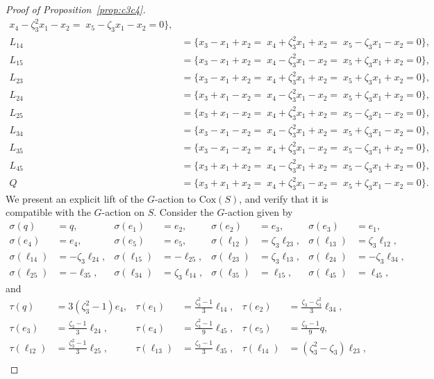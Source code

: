\documentclass[12pt, reqno]{amsart}
\theoremstyle{plain}
\theoremstyle{remark}
\theoremstyle{definition}
\numberwithin{equation}{section}
\def\Cox{\mathrm{Cox}}
\begin{document}
\begin{proof}[Proof of Proposition~\ref{prop:c3c4}]
{\begin{align*}
x_4-\zeta_3^2x_1-x_2=\;
x_5-\zeta_3 x_1-x_2
=0\},\\
L_{14}
&= \{
x_3-x_1+x_2=\;
x_4+\zeta_3^2x_1+x_2=\;
x_5-\zeta_3 x_1-x_2
=0\},\\
L_{15}
&= \{
x_3-x_1+x_2=\;
x_4-\zeta_3^2x_1-x_2=\;
x_5+\zeta_3 x_1+x_2
=0\},\\
L_{23}
&= \{
x_3-x_1+x_2=\;
x_4+\zeta_3^2x_1+x_2=\;
x_5+\zeta_3 x_1+x_2
=0\},\\
L_{24}
&= \{
x_3+x_1-x_2=\;
x_4-\zeta_3^2x_1-x_2=\;
x_5+\zeta_3 x_1+x_2
=0\},\\
L_{25}
&= \{
x_3+x_1-x_2=\;
x_4+\zeta_3^2x_1+x_2=\;
x_5-\zeta_3 x_1-x_2
=0\},\\
L_{34}
&= \{
x_3-x_1-x_2=\;
x_4-\zeta_3^2x_1+x_2=\;
x_5+\zeta_3 x_1-x_2
=0\},\\
L_{35}
&= \{
x_3-x_1-x_2=\;
x_4+\zeta_3^2x_1-x_2=\;
x_5-\zeta_3 x_1+x_2
=0\},\\
L_{45}
&= \{
x_3+x_1+x_2=\;
x_4-\zeta_3^2x_1+x_2=\;
x_5-\zeta_3 x_1+x_2
=0\},\\
Q
&= \{
x_3+x_1+x_2=\;
x_4+\zeta_3^2x_1-x_2=\;
x_5+\zeta_3 x_1-x_2=0
\}.
\end{align*}}
 We present an explicit lift of the $G$-action to $\Cox(S)$, and verify that it is compatible with the $G$-action on $S$. Consider the $G$-action given by
\begin{align*}
\sigma(q)&=q,&
\sigma(e_1)&=e_2,&
\sigma(e_2)&=e_3,&
\sigma(e_3)&=e_1,\\
\sigma(e_4)&=e_4,&
\sigma(e_5)&=e_5,&
\sigma(\ell_{12})&=\zeta_3\ell_{23},&
\sigma(\ell_{13})&=\zeta_3\ell_{12},\\
\sigma(\ell_{14})&=-\zeta_3\ell_{24},&
\sigma(\ell_{15})&=-\ell_{25},&
\sigma(\ell_{23})&=\zeta_3\ell_{13},&
\sigma(\ell_{24})&=-\zeta_3\ell_{34},\\
\sigma(\ell_{25})&=-\ell_{35},&
\sigma(\ell_{34})&=\zeta_3\ell_{14},&
\sigma(\ell_{35})&=\ell_{15},&
\sigma(\ell_{45})&=\ell_{45},
\end{align*}
and
\begin{align*}
\tau(q)&=3(\zeta_3^2-1)e_4,&
\tau(e_1)&=\frac{\zeta_3^2-1}{3}\ell_{14},&
\tau(e_2)&=\frac{\zeta_3-\zeta_3^2}{3}\ell_{34},\\
\tau(e_3)&=\frac{\zeta_3-1}{3}\ell_{24},&
\tau(e_4)&=\frac{\zeta_3^2-1}{9}\ell_{45},&
\tau(e_5)&=\frac{\zeta_3-1}{9}q,\\
\tau(\ell_{12})&=\frac{\zeta_3^2-1}{3}\ell_{25},&
\tau(\ell_{13})&=\frac{\zeta_3-1}{3}\ell_{35},&
\tau(\ell_{14})&=(\zeta_3^2-\zeta_3)\ell_{23},\\

\end{align*}
\end{proof}
\end{document}
